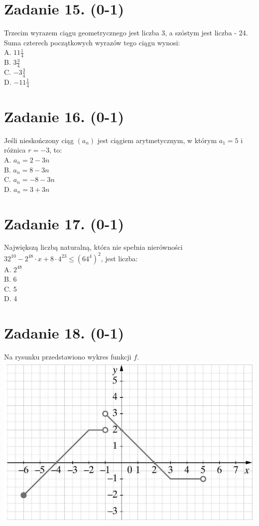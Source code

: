 \documentclass[10pt]{article}
\begin{document}
\section*{Zadanie 15. (0-1)}
Trzecim wyrazem ciągu geometrycznego jest liczba 3, a szóstym jest liczba - 24. Suma czterech początkowych wyrazów tego ciągu wynosi:\\
A. \(11 \frac{1}{4}\)\\
B. \(3 \frac{3}{4}\)\\
C. \(-3 \frac{3}{4}\)\\
D. \(-11 \frac{1}{4}\)

\section*{Zadanie 16. (0-1)}
Jeśli nieskończony ciąg \(\left(a_{n}\right)\) jest ciągiem arytmetycznym, w którym \(a_{1}=5\) i różnica \(r=-3\), to:\\
A. \(a_{n}=2-3 n\)\\
B. \(a_{n}=8-3 n\)\\
C. \(a_{n}=-8-3 n\)\\
D. \(a_{n}=3+3 n\)

\section*{Zadanie 17. (0-1)}
Największą liczbą naturalną, która nie spełnia nierówności \(32^{10}-2^{48} \cdot x+8 \cdot 4^{23} \leq\left(64^{4}\right)^{2}\), jest liczba:\\
A. \(2^{48}\)\\
B. 6\\
C. 5\\
D. 4

\section*{Zadanie 18. (0-1)}
Na rysunku przedstawiono wykres funkcji \(f\).\\
\includegraphics[max width=\textwidth, center]{2024_11_21_6574e892c2387ce90f12g-06}
\end{document}
